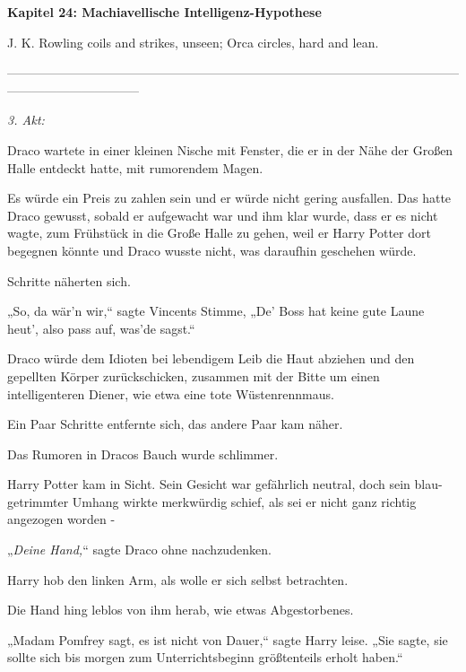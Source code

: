 

\hypertarget{machiavellische-intelligenz-hypothese}{%

\textbf{Kapitel 24: Machiavellische Intelligenz-Hypothese\\ }

J. K. Rowling coils and strikes, unseen; Orca circles, hard and lean.

--------------------------------------------------------------------------------------------------------------------------------------------

\emph{3. Akt:}

Draco wartete in einer kleinen Nische mit Fenster, die er in der Nähe der Großen Halle entdeckt hatte, mit rumorendem Magen.

Es würde ein Preis zu zahlen sein und er würde nicht gering ausfallen. Das hatte Draco gewusst, sobald er aufgewacht war und ihm klar wurde, dass er es nicht wagte, zum Frühstück in die Große Halle zu gehen, weil er Harry Potter dort begegnen könnte und Draco wusste nicht, was daraufhin geschehen würde.

Schritte näherten sich.

„So, da wär'n wir,“ sagte Vincents Stimme, „De' Boss hat keine gute Laune heut', also pass auf, was'de sagst.“

Draco würde dem Idioten bei lebendigem Leib die Haut abziehen und den gepellten Körper zurückschicken, zusammen mit der Bitte um einen intelligenteren Diener, wie etwa eine tote Wüstenrennmaus.

Ein Paar Schritte entfernte sich, das andere Paar kam näher.

Das Rumoren in Dracos Bauch wurde schlimmer.

Harry Potter kam in Sicht. Sein Gesicht war gefährlich neutral, doch sein blau-getrimmter Umhang wirkte merkwürdig schief, als sei er nicht ganz richtig angezogen worden -

„\emph{Deine Hand,}“ sagte Draco ohne nachzudenken.

Harry hob den linken Arm, als wolle er sich selbst betrachten.

Die Hand hing leblos von ihm herab, wie etwas Abgestorbenes.

„Madam Pomfrey sagt, es ist nicht von Dauer,“ sagte Harry leise. „Sie sagte, sie sollte sich bis morgen zum Unterrichtsbeginn größtenteils erholt haben.“

}
